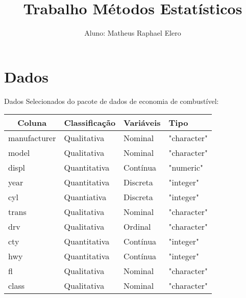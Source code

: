 \documentclass[a4paper,12pt]{article}
\begin{document}


\title{Trabalho Métodos Estatísticos}

\author{Aluno: Matheus Raphael Elero}

\maketitle

\section{Dados}

Dados Selecionados do pacote de dados de economia de combustível: 

\begin{table}[H]
\centering
\begin{tabular}{|l|l|l|l|}
\hline
\multicolumn{1}{|c|}{\textbf{Coluna}} & \multicolumn{1}{c|}{\textbf{Classificação}} & \textbf{Variáveis} & \textbf{Tipo} \\ \hline
manufacturer                          & Qualitativa                                 & Nominal            & "character"   \\ \hline
model                                 & Qualitativa                                 & Nominal            & "character"   \\ \hline
displ                                 & Quantitativa                                & Contínua           & "numeric"     \\ \hline
year                                  & Quantitativa                                & Discreta           & "integer"     \\ \hline
cyl                                   & Quantiativa                                 & Discreta           & "integer"     \\ \hline
trans                                 & Qualitativa                                 & Nominal            & "character"   \\ \hline
drv                                   & Qualitativa                                 & Ordinal            & "character"   \\ \hline
cty                                   & Quantitativa                                & Contínua           & "integer"     \\ \hline
hwy                                   & Quantitativa                                & Contínua           & "integer"     \\ \hline
fl                                    & Qualitativa                                 & Nominal            & "character"   \\ \hline
class                                 & Qualitativa                                 & Nominal            & "character"   \\ \hline
\end{tabular}
\end{table}
\end{document}
